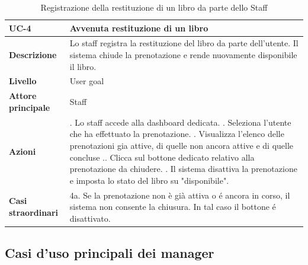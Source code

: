 \documentclass[twoside,openright,titlepage,fleqn,headinclude,12pt,a4paper,BCOR=5mm,footinclude]{scrbook}
\begin{document}
\begin{table}[H]
    \centering
    \begin{tabular}{|>{\raggedright\arraybackslash}m{2.5cm}|>{\raggedright\arraybackslash}m{10cm}|}
        \hline
        \textbf{UC-4} & \textbf{Avvenuta restituzione di un libro} \\
        \hline
        \textbf{Descrizione} & Lo staff registra la restituzione del libro da parte dell’utente. Il sistema chiude la prenotazione e rende nuovamente disponibile il libro. \\
        \hline
        \textbf{Livello} & User goal \\
        \hline
        \textbf{Attore principale} & Staff \\
        \hline
        \textbf{Azioni} & 
        1. Lo staff accede alla dashboard dedicata. \newline
        2. Seleziona l’utente che ha effettuato la prenotazione. \newline
        3. Visualizza l’elenco delle prenotazioni gia attive, di quelle non ancora attive e di quelle concluse .\newline
        4. Clicca sul bottone dedicato relativo alla prenotazione da chiudere. \newline
        5. Il sistema disattiva la prenotazione e imposta lo stato del libro su "disponibile". \\
        \hline
        \textbf{Casi straordinari} & 
        4a. Se la prenotazione non è già attiva o é ancora in corso, il sistema non consente la chiusura. In tal caso il bottone é disattivato.  \\
        \hline
    \end{tabular}
    \caption{Registrazione della restituzione di un libro da parte dello Staff}
    \label{tab:book_return}
\end{table}


\subsection{Casi d’uso principali dei manager}
\end{document}
